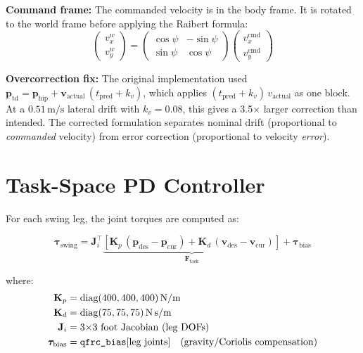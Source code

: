\documentclass[12pt,a4paper]{report}
\newcommand{\vect}[1]{\bm{#1}}
\newcommand{\mat}[1]{\mathbf{#1}}
\DeclareMathOperator{\diag}{diag}
\begin{document}
\textbf{Command frame:} The commanded velocity is in the body frame.  It is
rotated to the world frame before applying the Raibert formula:
\begin{equation}
    \begin{pmatrix}v_x^w \\ v_y^w\end{pmatrix} =
    \begin{pmatrix}\cos\psi & -\sin\psi \\ \sin\psi & \cos\psi\end{pmatrix}
    \begin{pmatrix}v_x^\text{cmd} \\ v_y^\text{cmd}\end{pmatrix}
\end{equation}

\textbf{Overcorrection fix:} The original implementation used
$\vect{p}_\text{td} = \vect{p}_\text{hip} + \vect{v}_\text{actual}\,(t_\text{pred} + k_v)$,
which applies $(t_\text{pred} + k_v)\,v_\text{actual}$ as one block.  At a
$0.51\,\text{m/s}$ lateral drift with $k_v = 0.08$, this gives a 3.5$\times$
larger correction than intended.  The corrected formulation separates nominal
drift (proportional to \emph{commanded} velocity) from error correction
(proportional to velocity \emph{error}).

\section{Task-Space PD Controller}

For each swing leg, the joint torques are computed as:

\begin{equation}
    \vect{\tau}_\text{swing} = \mat{J}_i^\top \underbrace{\left[
        \mat{K}_p\,(\vect{p}_\text{des} - \vect{p}_\text{cur}) +
        \mat{K}_d\,(\vect{v}_\text{des} - \vect{v}_\text{cur})
    \right]}_{\vect{F}_\text{task}} + \vect{\tau}_\text{bias}
    \label{eq:swing_pd}
\end{equation}

where:
\begin{align}
    \mat{K}_p &= \diag(400, 400, 400)\,\text{N/m} \\
    \mat{K}_d &= \diag(75, 75, 75)\,\text{N\,s/m} \\
    \mat{J}_i &= \text{3×3 foot Jacobian (leg DOFs)} \\
    \vect{\tau}_\text{bias} &= \texttt{qfrc\_bias}[\text{leg joints}]
    \quad\text{(gravity/Coriolis compensation)}
\end{align}
\end{document}
